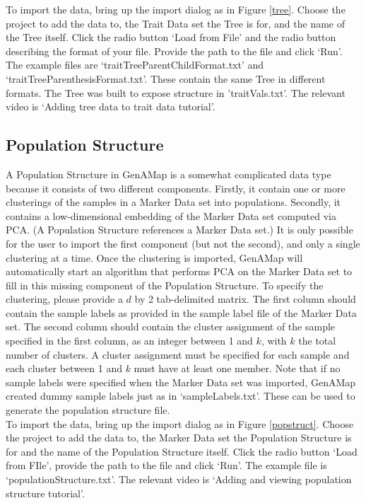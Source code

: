 \documentclass{article}
\begin{document}
To import the data, bring up the import dialog as in Figure \ref{tree}. Choose the project to add the data to, the Trait Data set the Tree is for, and the name of the Tree itself. Click the radio button `Load from File' and the radio button describing the format of your file. Provide the path to the file and click `Run'. The example files are `traitTreeParentChildFormat.txt' and `traitTreeParenthesisFormat.txt'. These contain the same Tree in different formats. The Tree was built to expose structure in 'traitVals.txt'. The relevant video is `Adding tree data to trait data tutorial'.

\subsection{Population Structure}

A Population Structure in GenAMap is a somewhat complicated data type because it consists of two different components. Firstly, it contain one or more clusterings of the samples in a Marker Data set into populations. Secondly, it contains a low-dimensional embedding of the Marker Data set computed via PCA. (A Population Structure references a Marker Data set.) It is only possible for the user to import the first component (but not the second), and only a single clustering at a time. Once the clustering is imported, GenAMap will automatically start an algorithm that performs PCA on the Marker Data set to fill in this missing component of the Population Structure. To specify the clustering, please provide a $d$ by 2 tab-delimited matrix. The first column should contain the sample labels as provided in the sample label file of the Marker Data set. The second column should contain the cluster assignment of the sample specified in the first column, as an integer between 1 and $k$, with $k$ the total number of clusters. A cluster assignment must be specified for each sample and each cluster between 1 and $k$ must have at least one member. Note that if no sample labels were specified when the Marker Data set was imported, GenAMap created dummy sample labels just as in `sampleLabels.txt'. These can be used to generate the population structure file.\\

To import the data, bring up the import dialog as in Figure \ref{popstruct}. Choose the project to add the data to, the Marker Data set the Population Structure is for and the name of the Population Structure itself. Click the radio button `Load from FIle', provide the path to the file and click `Run'. The example file is `populationStructure.txt'. The relevant video is `Adding and viewing population structure tutorial'.
\end{document}
